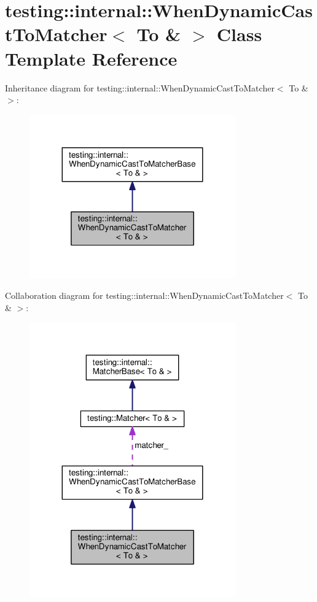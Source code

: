 \hypertarget{classtesting_1_1internal_1_1WhenDynamicCastToMatcher_3_01To_01_6_01_4}{}\section{testing\+:\+:internal\+:\+:When\+Dynamic\+Cast\+To\+Matcher$<$ To \& $>$ Class Template Reference}
\label{classtesting_1_1internal_1_1WhenDynamicCastToMatcher_3_01To_01_6_01_4}


Inheritance diagram for testing\+:\+:internal\+:\+:When\+Dynamic\+Cast\+To\+Matcher$<$ To \& $>$\+:\nopagebreak
\begin{figure}[H]
\begin{center}
\leavevmode
\includegraphics[width=251pt]{classtesting_1_1internal_1_1WhenDynamicCastToMatcher_3_01To_01_6_01_4__inherit__graph}
\end{center}
\end{figure}


Collaboration diagram for testing\+:\+:internal\+:\+:When\+Dynamic\+Cast\+To\+Matcher$<$ To \& $>$\+:\nopagebreak
\begin{figure}[H]
\begin{center}
\leavevmode
\includegraphics[width=251pt]{classtesting_1_1internal_1_1WhenDynamicCastToMatcher_3_01To_01_6_01_4__coll__graph}
\end{center}
\end{figure}
